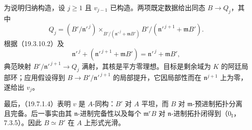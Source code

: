 为说明归纳构造，设 $j\ge1$ 且 $v_{j-1}$ 已构造。两项既定数据给出同态 $B\to Q_j$，其中
\[
 Q_j=(B'/\mathfrak n'^{\,j})
 \mathop{\times}_{B'/(\mathfrak n'^{\,j}+\mathfrak mB')}
 B'/(\mathfrak n'^{\,j+1}+\mathfrak mB').
\]
根据（19.3.10.2）及
\[
 \mathfrak n'^{\,j}+(\mathfrak n'^{\,j+1}+\mathfrak mB')
 =\mathfrak n'^{\,j}+\mathfrak mB',
\]
典范映射 $B'/\mathfrak n'^{\,j+1}\to Q_j$ 满射，其核是平方零理想。目标是剩余域为 $K$ 的阿廷局部环；应用假设得到 $B\to B'/\mathfrak n'^{\,j+1}$ 的局部提升，它因局部性而在 $\mathfrak n^{j+1}$ 上为零，遂给出 $v_j$。

最后，（19.7.1.4）表明 $v$ 是 $A$-同构：$B'$ 对 $A$ 平坦，而 $B$ 对 $\mathfrak m$-预进制拓扑分离且完备。后一事实由其 $\mathfrak n$-进制完备性以及每个 $\mathfrak m^rB$ 对 $\mathfrak n$-进制拓扑闭得到（$0_{\mathrm I}$，7.3.5）。因此 $B\simeq B'$ 在 $A$ 上形式光滑。
\finishproof
